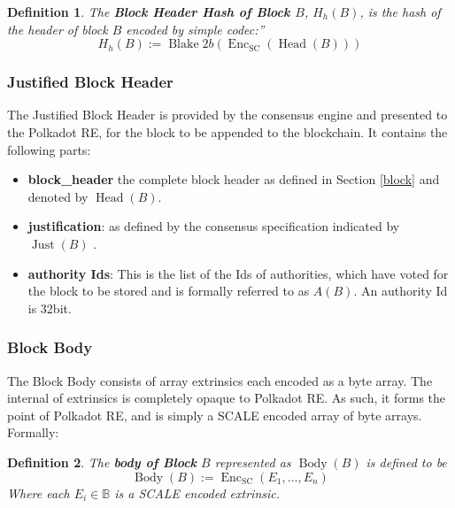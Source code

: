 \documentclass{book}
\newcommand{\assign}{:=}
\newcommand{\tmop}[1]{\ensuremath{\operatorname{#1}}}
\newcommand{\tmsamp}[1]{\textsf{#1}}
\newcommand{\tmstrong}[1]{\textbf{#1}}
\newcommand{\tmtextbf}[1]{{\bfseries{#1}}}
\newcommand{\tmtextsf}[1]{{\sffamily{#1}}}
\newcommand{\tmtexttt}[1]{{\ttfamily{#1}}}
\newcommand{\tmverbatim}[1]{{\ttfamily{#1}}}
\newtheorem{definition}{Definition}
\providecommand{\tmop}[1]{\ensuremath{\mathrm{#1}}}
\providecommand{\tmsamp}[1]{\tmtextsf{#1}}
\providecommand{\tmstrong}[1]{\tmtextbf{#1}}
\providecommand{\tmtextbf}[1]{\tmtextbf{#1}}
\providecommand{\tmverbatim}[1]{\tmtexttt{#1}}
\newtheorem{definition}{Definition}
\begin{document}
\begin{definition}
  \label{defn-block-header-hash}The {\tmstrong{Block Header Hash of Block
  $B$}}, {\tmstrong{$H_h (B)$}}, is the hash of the header of block $B$
  encoded by simple codec:''
  \[ H_h (B) \assign \tmop{Blake} 2 b (\tmop{Enc}_{\tmop{SC}} (\tmop{Head}
     (B))) \]
\end{definition}

\subsubsection{Justified Block Header}\label{sect-justified-block-header}

The Justified Block Header is provided by the consensus engine and presented
to the Polkadot RE, for the block to be appended to the blockchain. It
contains the following parts:
\begin{itemize}
  \item {\tmstrong{{\tmsamp{{\tmstrong{block\_header}}}}}} the complete block
  header as defined in Section \ref{block} and denoted by $\tmop{Head} (B)$.
  
  \item {\tmstrong{{\tmsamp{justification}}}}: as defined by the consensus
  specification indicated by $\tmop{Just} (B)$ {}.
  
  \item {\tmstrong{{\tmsamp{authority Ids}}}}: This is the list of the Ids of
  authorities, which have voted for the block to be stored and\tmverbatim{} is
  formally referred to as $A (B)$. An authority Id is 32bit.
\end{itemize}
\subsubsection{Block Body}\label{sect-block-body}

The Block Body consists of array extrinsics each encoded as a byte array. The
internal of extrinsics is completely opaque to Polkadot RE. As such, it forms
the point of Polkadot RE, and is simply a SCALE encoded array of byte arrays.
Formally:

\begin{definition}
  \label{defn-block-body}The {\tmstrong{body of Block}} $B$ represented as
  {\tmstrong{$\tmop{Body} (B)$}} is defined to be
  \[ \tmop{Body} (B) \assign \tmop{Enc}_{\tmop{SC}} (E_1, \ldots, E_n) \]
  Where each $E_i \in \mathbb{B}$ is a SCALE encoded extrinsic.
\end{definition}
\end{document}
